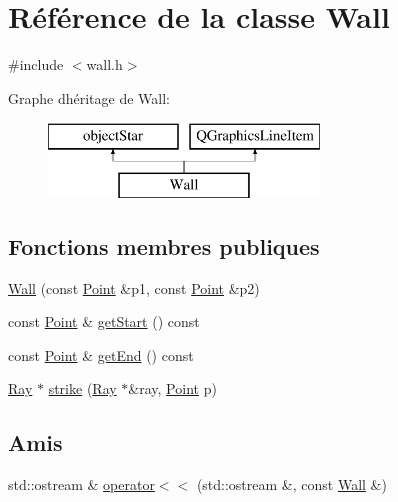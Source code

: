 \hypertarget{class_wall}{}\section{Référence de la classe Wall}
\label{class_wall}


{\ttfamily \#include $<$wall.\+h$>$}

Graphe d\textquotesingle{}héritage de Wall\+:\begin{figure}[H]
\begin{center}
\leavevmode
\includegraphics[height=2.000000cm]{class_wall}
\end{center}
\end{figure}
\subsection*{Fonctions membres publiques}
\begin{DoxyCompactItemize}
\item 
\mbox{\hyperlink{class_wall_aba4c8b8e0290442241a406781940ad18}{Wall}} (const \mbox{\hyperlink{class_point}{Point}} \&p1, const \mbox{\hyperlink{class_point}{Point}} \&p2)
\item 
const \mbox{\hyperlink{class_point}{Point}} \& \mbox{\hyperlink{class_wall_a174f962e72ade4212b51f7434cf2b514}{get\+Start}} () const
\item 
const \mbox{\hyperlink{class_point}{Point}} \& \mbox{\hyperlink{class_wall_ab710ef6a53f459ed7ce5667e55b0e9b9}{get\+End}} () const
\item 
\mbox{\hyperlink{class_ray}{Ray}} $\ast$ \mbox{\hyperlink{class_wall_a9ff7569800f55d50d4059ddfd780afe9}{strike}} (\mbox{\hyperlink{class_ray}{Ray}} $\ast$\&ray, \mbox{\hyperlink{class_point}{Point}} p)
\end{DoxyCompactItemize}
\subsection*{Amis}
\begin{DoxyCompactItemize}
\item 
std\+::ostream \& \mbox{\hyperlink{class_wall_a762127d24b7c3e98f9da57702f628a78}{operator$<$$<$}} (std\+::ostream \&, const \mbox{\hyperlink{class_wall}{Wall}} \&)
\end{DoxyCompactItemize}



